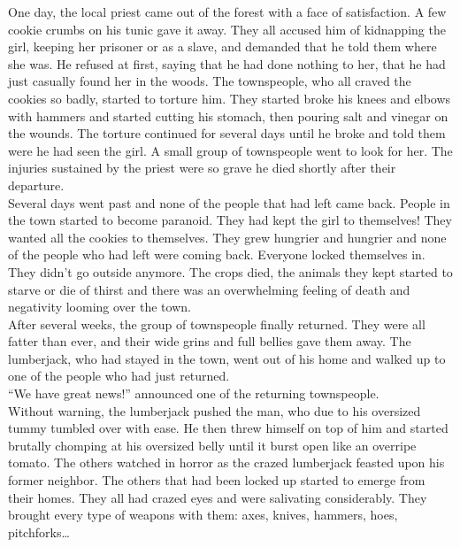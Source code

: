 \documentclass[a4paper,onecolumn,11pt]{article}
\begin{document}
One day, the local priest came out of the forest with a face of satisfaction. A few cookie crumbs on his tunic gave it away. They all accused him of kidnapping the girl, keeping her prisoner or as a slave, and demanded that he told them where she was. He refused at first, saying that he had done nothing to her, that he had just casually found her in the woods. The townspeople, who all craved the cookies so badly, started to torture him. They started broke his knees and elbows with hammers and started cutting his stomach, then pouring salt and vinegar on the wounds. The torture continued for several days until he broke and told them were he had seen the girl. A small group of townspeople went to look for her. The injuries sustained by the priest were so grave he died shortly after their departure.\\
\newline
Several days went past and none of the people that had left came back. People in the town started to become paranoid. They had kept the girl to themselves! They wanted all the cookies to themselves. They grew hungrier and hungrier and none of the people who had left were coming back. Everyone locked themselves in. They didn't go outside anymore. The crops died, the animals they kept started to starve or die of thirst and there was an overwhelming feeling of death and negativity looming over the town.\\
\newline
After several weeks, the group of townspeople finally returned. They were all fatter than ever, and their wide grins and full bellies gave them away. The lumberjack, who had stayed in the town, went out of his home and walked up to one of the people who had just returned.\\
\newline
``We have great news!'' announced one of the returning townspeople.\\
\newline
Without warning, the lumberjack pushed the man, who due to his oversized tummy tumbled over with ease. He then threw himself on top of him and started brutally chomping at his oversized belly until it burst open like an overripe tomato. The others watched in horror as the crazed lumberjack feasted upon his former neighbor. The others that had been locked up started to emerge from their homes. They all had crazed eyes and were salivating considerably. They brought every type of weapons with them: axes, knives, hammers, hoes, pitchforks\ldots \\
\end{document}
